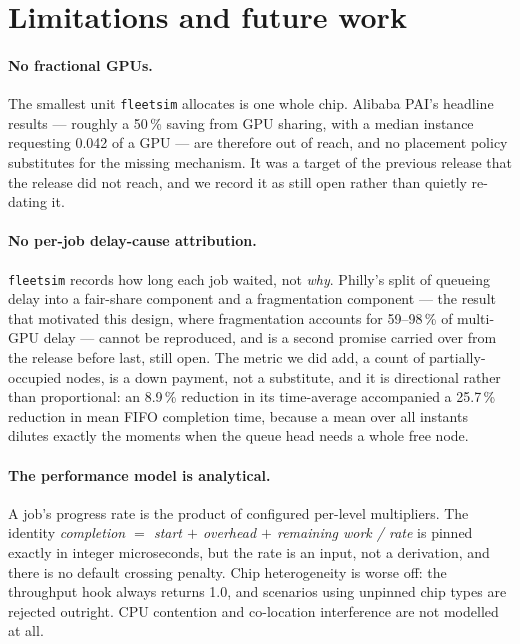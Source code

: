\section{Limitations and future work}
\label{sec:limitations}

\paragraph{No fractional GPUs.}
The smallest unit \texttt{fleetsim} allocates is one whole chip. Alibaba PAI's
headline results \cite{alibabapai2022} --- roughly a 50\,\% saving from GPU
sharing, with a median instance requesting 0.042 of a GPU --- are therefore out
of reach, and no placement policy substitutes for the missing mechanism. It was
a target of the previous release that the release did not reach, and we record
it as still open rather than quietly re-dating it.

\paragraph{No per-job delay-cause attribution.}
\texttt{fleetsim} records how long each job waited, not \emph{why}. Philly's
split of queueing delay into a fair-share component and a fragmentation component
\cite{philly2019} --- the result that motivated this design, where fragmentation
accounts for 59--98\,\% of multi-GPU delay --- cannot be reproduced, and is a
second promise carried over from the release before last, still open. The metric
we did add, a count of
partially-occupied nodes, is a down payment, not a substitute, and it is
directional rather than proportional: an 8.9\,\% reduction in its
time-average accompanied a 25.7\,\% reduction in mean FIFO completion time,
because a mean over all instants dilutes exactly the moments when the queue head
needs a whole free node.

\paragraph{The performance model is analytical.}
A job's progress rate is the product of configured per-level multipliers. The
identity \emph{completion $=$ start $+$ overhead $+$ remaining work / rate} is
pinned exactly in integer microseconds, but the rate is an input, not a
derivation, and there is no default crossing penalty. Chip heterogeneity is worse
off: the throughput hook always returns 1.0, and scenarios using unpinned chip
types are rejected outright. CPU contention and co-location interference are not
modelled at all.

